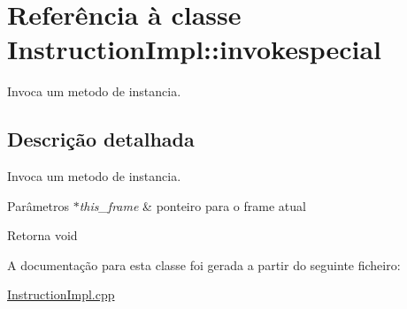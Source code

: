\hypertarget{class_instruction_impl_1_1invokespecial}{}\section{Referência à classe Instruction\+Impl\+:\+:invokespecial}
\label{class_instruction_impl_1_1invokespecial}


Invoca um metodo de instancia.  




\subsection{Descrição detalhada}
Invoca um metodo de instancia. 


\begin{DoxyParams}{Parâmetros}
{\em $\ast$this\+\_\+frame} & ponteiro para o frame atual \\
\hline
\end{DoxyParams}
\begin{DoxyReturn}{Retorna}
void 
\end{DoxyReturn}


A documentação para esta classe foi gerada a partir do seguinte ficheiro\+:\begin{DoxyCompactItemize}
\item 
\hyperlink{_instruction_impl_8cpp}{Instruction\+Impl.\+cpp}\end{DoxyCompactItemize}
